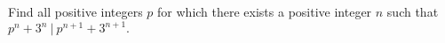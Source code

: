 Find all positive integers $p$ for which there exists a positive integer $n$ such that $p^n+3^n~|~p^{n+1}+3^{n+1}.$